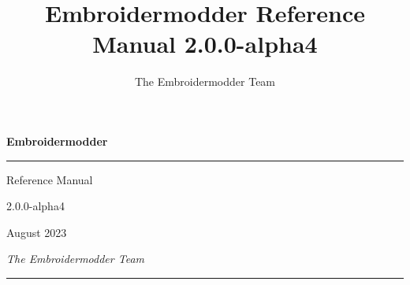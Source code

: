 
\usepackage[utf8]{inputenc}
\usepackage[T1]{fontenc}

\usepackage{courier}
\usepackage{tgbonum}
\usepackage{inconsolata}

\usepackage{geometry}
\usepackage{amsmath}
\usepackage{amssymb}
\usepackage{listings}
\usepackage{hyperref}
\usepackage{natbib}
\usepackage{longtable}
\usepackage{fancyhdr}
\usepackage{makeidx}
\usepackage{graphicx}
\usepackage{color}
\usepackage{xcolor}


\geometry{
    margin=1.4in,
    marginparwidth=0.8in
}

\newcommand{\embversion}{2.0.0-alpha4}
\newcommand{\version}{\embversion}
\newcommand{\libembversion}{1.0.0-alpha}
\newcommand{\publicationdate}{August 2023}

\newcommand{\todo}[1]{\marginpar{\emph{TODO}\\{\footnotesize #1}}}

\makeindex

\title{Embroidermodder Reference Manual \embversion}
\author{The Embroidermodder Team}

\lstset{
  basicstyle=\ttfamily\footnotesize,
  language=C,
  numbers=left,
  extendedchars=true,
  title=\lstname,
  frame=single
}

\hypersetup{
  colorlinks=true,
  breaklinks=true,
  linkcolor=black,
  filecolor=black,      
  urlcolor=black,
  citecolor=black
}



\begin{titlepage}

\vspace*{8cm}

\noindent\textbf{\Huge Embroidermodder}

\vspace{10pt}

\noindent\rule{\linewidth}{2pt}

\vspace{10pt}

\begin{flushright}
\Large
    Reference Manual

\embversion

\publicationdate
\end{flushright}

\vspace{6cm}

\begin{flushleft}
\Large
\emph{The Embroidermodder Team}

\vspace{10pt}

\noindent\rule{\linewidth}{1pt}

\end{flushleft}
    
\end{titlepage}


